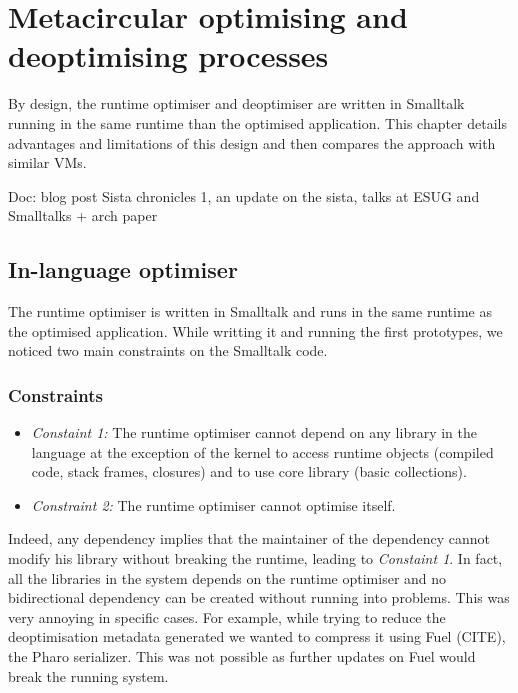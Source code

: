 \documentclass[a4paper,12pt,twoside]{../includes/ThesisStyle}
\begin{document}
\fi

\chapter{Metacircular optimising and deoptimising processes}
\label{chap:metacircular}
\minitoc

By design, the runtime optimiser and deoptimiser are written in Smalltalk running in the same runtime than the optimised application. This chapter details advantages and limitations of this design and then compares the approach with similar VMs.

Doc: blog post Sista chronicles 1, an update on the sista, talks at ESUG and Smalltalks + arch paper

\section{In-language optimiser}

The runtime optimiser is written in Smalltalk and runs in the same runtime as the optimised application. While writting it and running the first prototypes, we noticed two main constraints on the Smalltalk code.

\subsection{Constraints}

\begin{itemize}
	\item \emph{Constaint 1:} The runtime optimiser cannot depend on any library in the language at the exception of the kernel to access runtime objects (compiled code, stack frames, closures) and to use core library (basic collections). 
	\item \emph{Constraint 2:} The runtime optimiser cannot optimise itself.
\end{itemize}

Indeed, any dependency implies that the maintainer of the dependency cannot modify his library without breaking the runtime, leading to \emph{Constaint 1}. In fact, all the libraries in the system depends on the runtime optimiser and no bidirectional dependency can be created without running into problems. This was very annoying in specific cases. For example, while trying to reduce the deoptimisation metadata generated we wanted to compress it using Fuel (CITE), the Pharo serializer. This was not possible as further updates on Fuel would break the running system.
\end{document}
